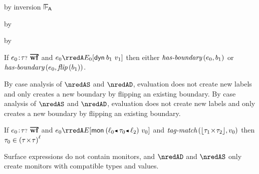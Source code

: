 {\begin{lamportproof*}
    \begin{pfproof}
        \begin{pfproof}
          by inversion $\sWLA$
        \end{pfproof}
      \qedstep
        \begin{pfproof}
          by \pfih
        \end{pfproof}
    \end{pfproof}

    \begin{pfproof}
      \qedstep
        \begin{pfproof}
          by \pfih
        \end{pfproof}
    \end{pfproof}

\end{lamportproof*}}

\begin{lemma}\label{A-source-boundary}\leavevmode
  If\/ $\fwellformedO{\sexpr_0}{\stoptional}$
  and\/ $\sexpr_0 \rredA \ctx_0[{\edynb{\sbnd_1}{\svalue_1}}]$
  then either\/ $\textit{has-boundary}\,(e_0, b_1)$ or $\textit{has-boundary}\,(e_0, \textit{flip}\,(b_1))$.
\end{lemma}{
  \newcommand{\shortpf}{By case analysis of $\nredAS$ and $\nredAD$, evaluation does not create new labels and only creates a new boundary by flipping an existing boundary.}
\begin{lamportproof*}
  \shortpf
\mainproof
  \shortpf

\end{lamportproof*}}

\begin{lemma}\label{A-mon-compat}\leavevmode
      If\/ $\fwellformedO{\sexpr_0}{\stoptional}$
      and\/ $\sexpr_0 \rredA \ctx[\emon{\obnd{\sowner_0}{\stype_0}{\sowner_2}}{\svalue_0}]$
      and\/ $\textit{tag-match}\,(\lfloor \tau_1\!\times\!\tau_2 \rfloor,v_0)$
      then\/ $\tau_0 \in {(\tau\!\times\!\tau)}^{\ell}$
\end{lemma}{
\begin{lamportproof}
  Surface expressions do not contain monitors, and $\nredAD$ and $\nredAS$ only
  create monitors with compatible types and values.
\end{lamportproof}}

